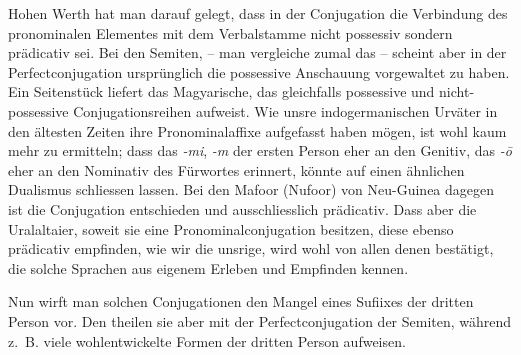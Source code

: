 Hohen Werth hat man darauf gelegt, dass in der Conjugation die Verbindung des pronominalen Elementes mit dem Verbalstamme nicht possessiv sondern prädicativ sei. Bei den Semiten, – man vergleiche zumal das  – scheint aber in der Perfectconjugation ursprünglich die possessive Anschauung vorgewaltet zu haben. Ein Seitenstück liefert das Magyarische, das gleichfalls possessive und nicht-posses\label{fp.375}sive Conjugationsreihen aufweist. Wie unsre indogermanischen Urväter in den ältesten Zeiten ihre Pronominalaffixe aufgefasst haben mögen, ist wohl kaum mehr zu ermitteln; dass das \textit{-mi}, \textit{-m} der ersten Person eher an den Genitiv, das \textit{-ō} eher an den Nominativ des Fürwortes erinnert, könnte auf einen ähnlichen Dualismus schliessen lassen. Bei den Mafoor (Nufoor) von Neu-Guinea  dagegen ist die Conjugation entschieden und ausschliesslich prädicativ. Dass aber die Uralaltaier, soweit sie eine Pronominalconjugation besitzen, diese ebenso prädicativ empfinden, wie wir die unsrige, wird wohl von allen denen bestätigt, die solche Sprachen aus eigenem Erleben und Empfinden kennen.

Nun wirft man solchen Conjugationen den Mangel eines Sufiixes der dritten Person vor. Den theilen sie aber mit der Perfectconjugation der Semiten, während \label{sp.392} z.~B. viele  wohlentwickelte Formen der dritten Person aufweisen.


